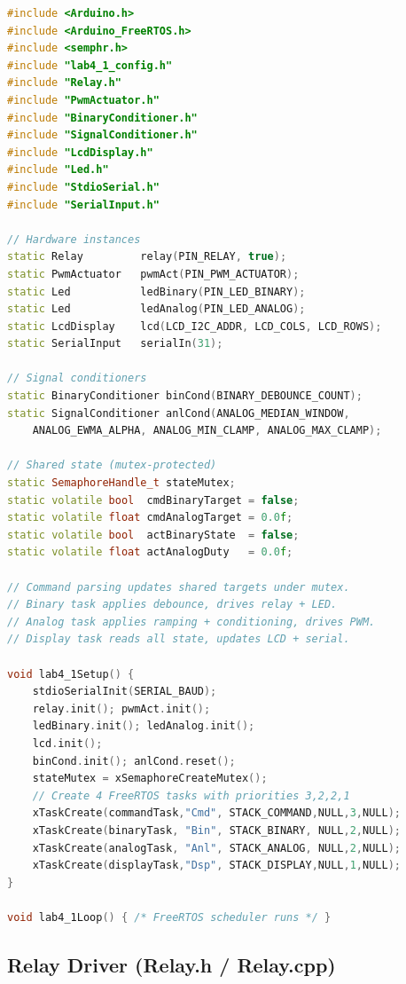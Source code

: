\begin{lstlisting}[language=C++, caption={FreeRTOS task orchestration for dual actuator control}]
#include <Arduino.h>
#include <Arduino_FreeRTOS.h>
#include <semphr.h>
#include "lab4_1_config.h"
#include "Relay.h"
#include "PwmActuator.h"
#include "BinaryConditioner.h"
#include "SignalConditioner.h"
#include "LcdDisplay.h"
#include "Led.h"
#include "StdioSerial.h"
#include "SerialInput.h"

// Hardware instances
static Relay         relay(PIN_RELAY, true);
static PwmActuator   pwmAct(PIN_PWM_ACTUATOR);
static Led           ledBinary(PIN_LED_BINARY);
static Led           ledAnalog(PIN_LED_ANALOG);
static LcdDisplay    lcd(LCD_I2C_ADDR, LCD_COLS, LCD_ROWS);
static SerialInput   serialIn(31);

// Signal conditioners
static BinaryConditioner binCond(BINARY_DEBOUNCE_COUNT);
static SignalConditioner anlCond(ANALOG_MEDIAN_WINDOW,
    ANALOG_EWMA_ALPHA, ANALOG_MIN_CLAMP, ANALOG_MAX_CLAMP);

// Shared state (mutex-protected)
static SemaphoreHandle_t stateMutex;
static volatile bool  cmdBinaryTarget = false;
static volatile float cmdAnalogTarget = 0.0f;
static volatile bool  actBinaryState  = false;
static volatile float actAnalogDuty   = 0.0f;

// Command parsing updates shared targets under mutex.
// Binary task applies debounce, drives relay + LED.
// Analog task applies ramping + conditioning, drives PWM.
// Display task reads all state, updates LCD + serial.

void lab4_1Setup() {
    stdioSerialInit(SERIAL_BAUD);
    relay.init(); pwmAct.init();
    ledBinary.init(); ledAnalog.init();
    lcd.init();
    binCond.init(); anlCond.reset();
    stateMutex = xSemaphoreCreateMutex();
    // Create 4 FreeRTOS tasks with priorities 3,2,2,1
    xTaskCreate(commandTask,"Cmd", STACK_COMMAND,NULL,3,NULL);
    xTaskCreate(binaryTask, "Bin", STACK_BINARY, NULL,2,NULL);
    xTaskCreate(analogTask, "Anl", STACK_ANALOG, NULL,2,NULL);
    xTaskCreate(displayTask,"Dsp", STACK_DISPLAY,NULL,1,NULL);
}

void lab4_1Loop() { /* FreeRTOS scheduler runs */ }
\end{lstlisting}

\subsection{Relay Driver (Relay.h / Relay.cpp)}

